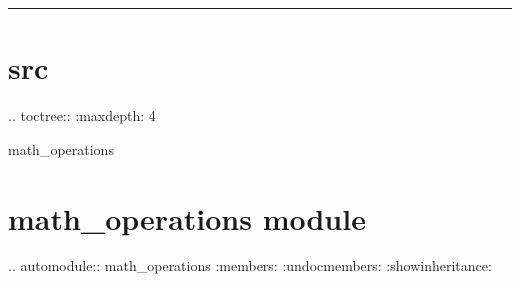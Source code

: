 \documentclass[a4paper,10pt,spanish]{sphinxmanual}
\begin{document}
\bigskip\hrule\bigskip


\sphinxstepscope


\section{src}
\label{\detokenize{modules:src}}\label{\detokenize{modules::doc}}
\sphinxAtStartPar
.. toctree::
:maxdepth: 4

\sphinxAtStartPar
math\_operations

\sphinxstepscope


\section{math\_operations module}
\label{\detokenize{math_operations:math-operations-module}}\label{\detokenize{math_operations::doc}}
\sphinxAtStartPar
.. automodule:: math\_operations
:members:
:undoc\sphinxhyphen{}members:
:show\sphinxhyphen{}inheritance:



\renewcommand{\indexname}{Índice}
\printindex
\end{document}
